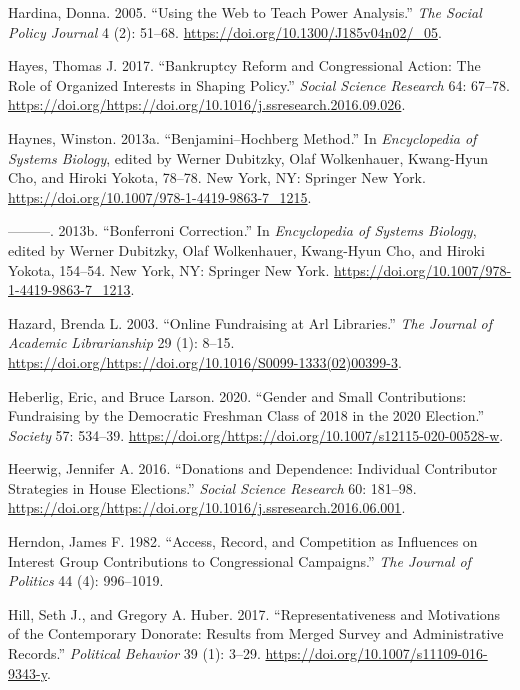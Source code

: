 \documentclass[12pt,]{article}
\begin{document}
\leavevmode\hypertarget{ref-hardina2005}{}%
Hardina, Donna. 2005. ``Using the Web to Teach Power Analysis.''
\emph{The Social Policy Journal} 4 (2): 51--68.
\url{https://doi.org/10.1300/J185v04n02/_05}.

\leavevmode\hypertarget{ref-hayes2017}{}%
Hayes, Thomas J. 2017. ``Bankruptcy Reform and Congressional Action: The
Role of Organized Interests in Shaping Policy.'' \emph{Social Science
Research} 64: 67--78.
\url{https://doi.org/https://doi.org/10.1016/j.ssresearch.2016.09.026}.

\leavevmode\hypertarget{ref-bh}{}%
Haynes, Winston. 2013a. ``Benjamini--Hochberg Method.'' In
\emph{Encyclopedia of Systems Biology}, edited by Werner Dubitzky, Olaf
Wolkenhauer, Kwang-Hyun Cho, and Hiroki Yokota, 78--78. New York, NY:
Springer New York. \url{https://doi.org/10.1007/978-1-4419-9863-7_1215}.

\leavevmode\hypertarget{ref-bonferroni}{}%
---------. 2013b. ``Bonferroni Correction.'' In \emph{Encyclopedia of
Systems Biology}, edited by Werner Dubitzky, Olaf Wolkenhauer,
Kwang-Hyun Cho, and Hiroki Yokota, 154--54. New York, NY: Springer New
York. \url{https://doi.org/10.1007/978-1-4419-9863-7_1213}.

\leavevmode\hypertarget{ref-hazard2003}{}%
Hazard, Brenda L. 2003. ``Online Fundraising at Arl Libraries.''
\emph{The Journal of Academic Librarianship} 29 (1): 8--15.
\url{https://doi.org/https://doi.org/10.1016/S0099-1333(02)00399-3}.

\leavevmode\hypertarget{ref-heberlig2020}{}%
Heberlig, Eric, and Bruce Larson. 2020. ``Gender and Small
Contributions: Fundraising by the Democratic Freshman Class of 2018 in
the 2020 Election.'' \emph{Society} 57: 534--39.
\url{https://doi.org/https://doi.org/10.1007/s12115-020-00528-w}.

\leavevmode\hypertarget{ref-heerwig2016}{}%
Heerwig, Jennifer A. 2016. ``Donations and Dependence: Individual
Contributor Strategies in House Elections.'' \emph{Social Science
Research} 60: 181--98.
\url{https://doi.org/https://doi.org/10.1016/j.ssresearch.2016.06.001}.

\leavevmode\hypertarget{ref-herndon1982}{}%
Herndon, James F. 1982. ``Access, Record, and Competition as Influences
on Interest Group Contributions to Congressional Campaigns.'' \emph{The
Journal of Politics} 44 (4): 996--1019.

\leavevmode\hypertarget{ref-hill2017}{}%
Hill, Seth J., and Gregory A. Huber. 2017. ``Representativeness and
Motivations of the Contemporary Donorate: Results from Merged Survey and
Administrative Records.'' \emph{Political Behavior} 39 (1): 3--29.
\url{https://doi.org/10.1007/s11109-016-9343-y}.
\end{document}
